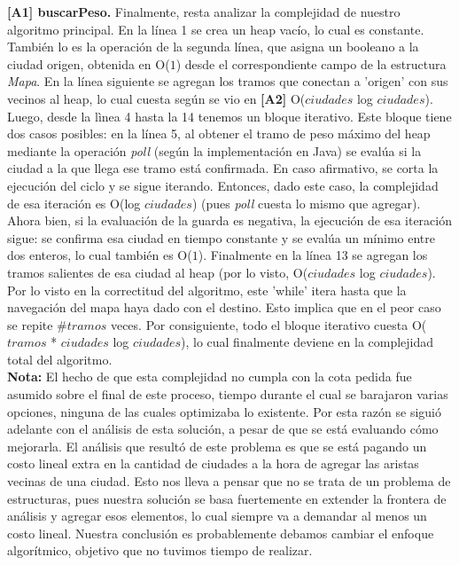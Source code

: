 \textbf{[A1] buscarPeso.} Finalmente, resta analizar la complejidad de nuestro algoritmo principal. En la línea 1 se crea un heap vacío, lo cual es constante. También lo es la operación de la segunda línea, que asigna un booleano a la ciudad origen, obtenida en O($1$) desde el correspondiente campo de la estructura \textsl{Mapa}. En la línea siguiente se agregan los tramos que conectan a 'origen' con sus vecinos al heap, lo cual cuesta según se vio en \textbf{[A2]} O($ciudades$ log $ciudades$). Luego, desde la lìnea 4 hasta la 14 tenemos un bloque iterativo. Este bloque tiene dos casos posibles: en la línea 5, al obtener el tramo de peso máximo del heap mediante la operación \textsl{poll} (según la implementación en Java) se evalúa si la ciudad a la que llega ese tramo está confirmada. En caso afirmativo, se corta la ejecución del ciclo y se sigue iterando. Entonces, dado este caso, la complejidad de esa iteración es O(log $ciudades$) (pues \textsl{poll} cuesta lo mismo que agregar). Ahora bien, si la evaluación de la guarda es negativa, la ejecución de esa iteración sigue: se confirma esa ciudad en tiempo constante y se evalúa un mínimo entre dos enteros, lo cual también es O($1$). Finalmente en la línea 13 se agregan los tramos salientes de esa ciudad al heap (por lo visto, O($ciudades$ log $ciudades$).\\
\indent Por lo visto en la correctitud del algoritmo, este 'while' itera hasta que la navegación del mapa haya dado con el destino. Esto implica que en el peor caso se repite $\#tramos$ veces. Por consiguiente, todo el bloque iterativo cuesta O($tramos$ * $ciudades$ log $ciudades$), lo cual finalmente deviene en la complejidad total del algoritmo. \\

\textbf{Nota:} El hecho de que esta complejidad no cumpla con la cota pedida fue asumido sobre el final de este proceso, tiempo durante el cual se barajaron varias opciones, ninguna de las cuales optimizaba lo existente. Por esta razón se siguió adelante con el análisis de esta solución, a pesar de que se está evaluando cómo mejorarla. El análisis que resultó de este problema es que se está pagando un costo lineal extra en la cantidad de ciudades a la hora de agregar las aristas vecinas de una ciudad. Esto nos lleva a pensar que no se trata de un problema de estructuras, pues nuestra solución se basa fuertemente en extender la frontera de análisis y agregar esos elementos, lo cual siempre va a demandar al menos un costo lineal. Nuestra conclusión es probablemente debamos cambiar el enfoque algorítmico, objetivo que no tuvimos tiempo de realizar.

